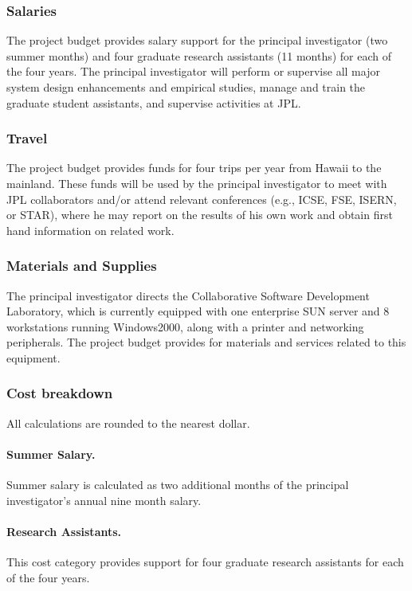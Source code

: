 \subsubsection*{Salaries}

The project budget provides salary support for the principal investigator
(two summer months) and four graduate research assistants (11 months) for
each of the four years.  The principal investigator will perform or
supervise all major system design enhancements and empirical studies,
manage and train the graduate student assistants, and supervise activities
at JPL.

\subsubsection*{Travel}

The project budget provides funds for four trips per year from Hawaii to
the mainland.  These funds will be used by the principal investigator to
meet with JPL collaborators and/or attend relevant conferences (e.g., ICSE,
FSE, ISERN, or STAR), where he may report on the results of his own work
and obtain first hand information on related work. 

\subsubsection*{Materials and Supplies}

The principal investigator directs the Collaborative Software Development
Laboratory, which is currently equipped with one enterprise SUN server and 8
workstations running Windows2000, along with a printer and 
networking peripherals.  The project budget provides for materials and services related
to this equipment.

\subsubsection*{Cost breakdown}
\label{cost-breakdown}

All calculations are rounded to the nearest dollar.

\paragraph{Summer Salary.}  
Summer salary is calculated as two additional months of the principal
investigator's annual nine month salary.   

\paragraph*{Research Assistants.}  
This cost category provides support for four graduate research assistants
for each of the four years.  

